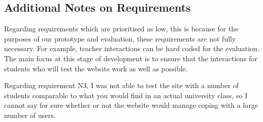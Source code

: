 \documentclass[a4paper,11pt]{report}
\begin{document}
\subsection{Additional Notes on Requirements}
Regarding requirements which are prioritised as low, this is because for the purposes of our prototype and evaluation, these requirements are not fully necessary. For example, teacher interactions can be hard coded for the evaluation. The main focus at this stage of development is to ensure that the interactions for students who will test the website work as well as possible.\par
Regarding requirement N3, I was not able to test the site with a number of students comparable to what you would find in an actual university class, so I cannot say for sure whether or not the website would manage coping with a large number of users.
\end{document}
